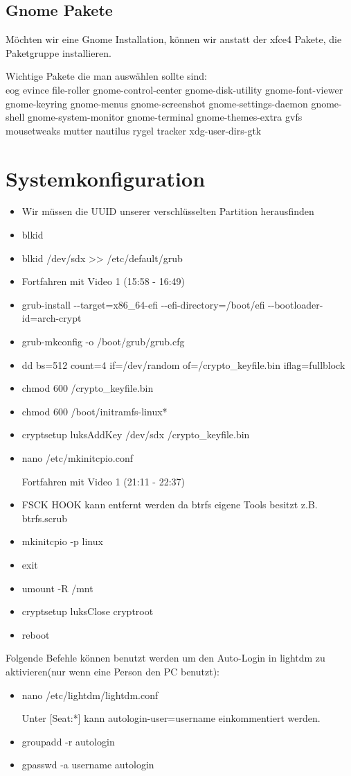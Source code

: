 \documentclass[11pt,a4paper]{article}
\begin{document}
\subsection{Gnome Pakete}
Möchten wir eine Gnome Installation, können wir anstatt der xfce4 Pakete, die Paketgruppe \textcolor{red}{} installieren.

Wichtige Pakete die man auswählen sollte sind:\\

eog evince file-roller gnome-control-center gnome-disk-utility gnome-font-viewer gnome-keyring gnome-menus gnome-screenshot gnome-settings-daemon gnome-shell gnome-system-monitor gnome-terminal  gnome-themes-extra gvfs mousetweaks mutter nautilus rygel tracker xdg-user-dirs-gtk
\section{Systemkonfiguration }
\begin{itemize}
\item Wir müssen die UUID unserer verschlüsselten Partition herausfinden
\item blkid
\item blkid /dev/sdx >{}> /etc/default/grub
\item Fortfahren mit Video 1 (15:58 - 16:49)
\item grub-install -{}-target=x86\_64-efi -{}-efi-directory=/boot/efi -{}-bootloader-id=arch-crypt 
\item grub-mkconfig -o /boot/grub/grub.cfg
\item dd bs=512 count=4 if=/dev/random of=/crypto\_keyfile.bin iflag=fullblock
\item chmod 600 /crypto\_keyfile.bin
\item chmod 600 /boot/initramfs-linux*
\item cryptsetup luksAddKey /dev/sdx /crypto\_keyfile.bin
\item nano /etc/mkinitcpio.conf

Fortfahren mit Video 1 (21:11 - 22:37)
\item FSCK HOOK kann entfernt werden da btrfs eigene Tools besitzt z.B. btrfs.scrub
\item mkinitcpio -p linux
\item exit
\item umount -R /mnt
\item cryptsetup luksClose cryptroot
\item reboot
\end{itemize}
Folgende Befehle können benutzt werden um den Auto-Login in lightdm zu aktivieren(nur wenn eine Person den PC benutzt):
\begin{itemize}
\item nano /etc/lightdm/lightdm.conf

Unter [Seat:*] kann autologin-user=username einkommentiert werden.
\item groupadd -r autologin
\item gpasswd -a \glqq{}username\grqq{} autologin 
\end{itemize}
\end{document}
